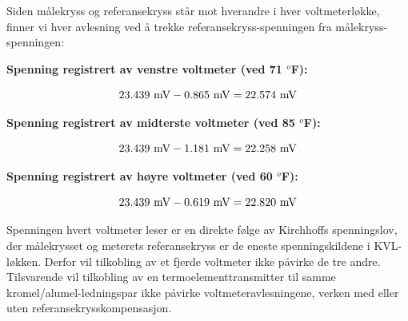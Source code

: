 \vskip 10pt

Siden målekryss og referansekryss står mot hverandre i hver voltmeterløkke, finner vi hver avlesning ved å trekke referansekryss-spenningen fra målekryss-spenningen:

\vskip 10pt

\noindent
{\bf Spenning registrert av venstre voltmeter (ved 71 $^{o}$F):}

$$23.439 \hbox{ mV} - 0.865 \hbox{ mV} = 22.574 \hbox{ mV}$$

\vskip 10pt

\noindent
{\bf Spenning registrert av midterste voltmeter (ved 85 $^{o}$F):}

$$23.439 \hbox{ mV} - 1.181 \hbox{ mV} = 22.258 \hbox{ mV}$$

\vskip 10pt

\noindent
{\bf Spenning registrert av høyre voltmeter (ved 60 $^{o}$F):}

$$23.439 \hbox{ mV} - 0.619 \hbox{ mV} = 22.820 \hbox{ mV}$$

\vskip 10pt

Spenningen hvert voltmeter leser er en direkte følge av Kirchhoffs spenningslov, der målekrysset og meterets referansekryss er de eneste spenningskildene i KVL-løkken. Derfor vil tilkobling av et fjerde voltmeter ikke påvirke de tre andre. Tilsvarende vil tilkobling av en termoelementtransmitter til samme kromel/alumel-ledningspar ikke påvirke voltmeteravlesningene, verken med eller uten referansekrysskompensasjon.









